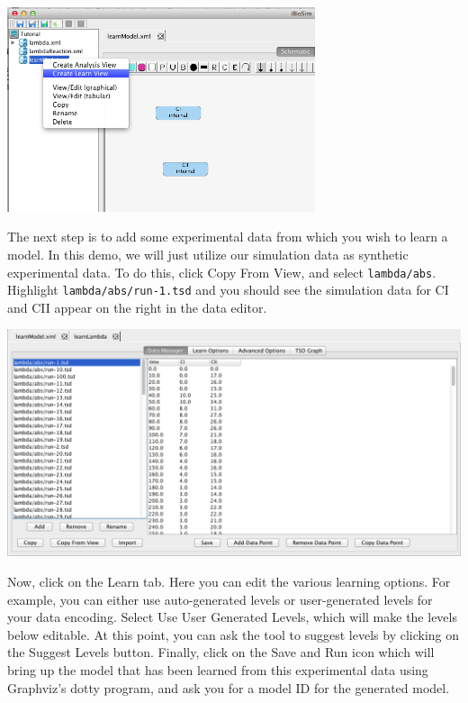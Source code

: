 \documentclass[titlepage,11pt]{article}
\begin{document}
\begin{center}
\includegraphics[height=60mm]{screenshots/createLearn}
\end{center}

The next step is to add some experimental data from which you wish to learn a model.  In this demo, we will just utilize our simulation data as synthetic experimental data.  To do this, click Copy From View, and select {\tt lambda/abs}.  Highlight {\tt lambda/abs/run-1.tsd} and you should see the simulation data for CI and CII appear on the right in the data editor. 

\begin{center}
\includegraphics[width=160mm]{screenshots/dataManager}
\end{center}

Now, click on the Learn tab.  Here you can edit the various learning options.  For example, you can either use auto-generated levels or user-generated levels for your data encoding.  Select Use User Generated Levels, which will make the levels below editable.  At this point, you can ask the tool to suggest levels by clicking on the Suggest Levels button.  Finally, click on the Save and Run icon which will bring up the model that has been learned from this experimental data using Graphviz's dotty program, and ask you for a model ID for the generated model.  
\end{document}
